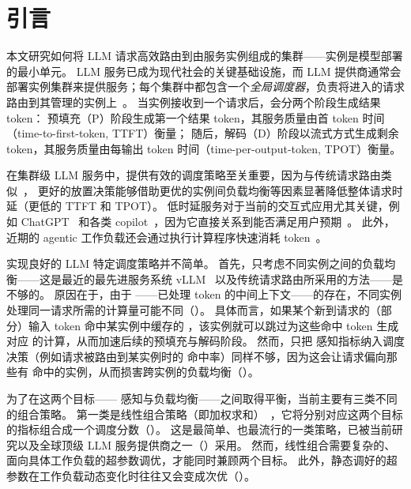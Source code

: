 \section{引言}
\label{sec:intro}

\noindent
本文研究如何将 LLM 请求高效路由到由服务实例组成的集群——实例是模型部署的最小单元。
LLM 服务已成为现代社会的关键基础设施，而 LLM 提供商通常会部署实例集群来提供服务；每个集群中都包含一个\emph{全局调度器}，负责将进入的请求路由到其管理的实例上~\cite{305212,DBLP:conf/sosp/Xiang0QYZYZL0025,
DBLP:journals/corr/abs-2505-09999, llm-d, ai-Dynamo, aigw, vllm-code}。
当实例接收到一个请求后，会分两个阶段生成结果 token：
预填充（P）阶段生成第一个结果 token，其服务质量由首 token 时间（time-to-first-token, TTFT）衡量；
随后，解码（D）阶段以流式方式生成剩余 token，其服务质量由每输出 token 时间（time-per-output-token, TPOT）衡量。

在集群级 LLM 服务中，提供有效的调度策略至关重要，因为与传统请求路由类似~\cite{DBLP:conf/asplos/DelimitrouK14,DBLP:conf/eurosys/ZhangTHJGW13,DBLP:conf/osdi/GogSGWH16}，
更好的放置决策能够借助更优的实例间负载均衡等因素显著降低整体请求时延（更低的 TTFT 和 TPOT）。
低时延服务对于当前的交互式应用尤其关键，例如 ChatGPT~\cite{chatgpt} 和各类 copilot~\cite{copilot}，因为它直接关系到能否满足用户预期~\cite{latency-study,DBLP:conf/osdi/ZhongLCHZL0024,aws-latency}。
此外，近期的 agentic 工作负载还会通过执行计算程序快速消耗 token~\cite{claudeapi,geminiapi,openaiapi}。

实现良好的 LLM 特定调度策略并不简单。
首先，只考虑不同实例之间的负载均衡——这是最近的最先进服务系统 vLLM~\cite{vllm-code} 以及传统请求路由所采用的方法——是不够的。
原因在于，由于 {\kvcache}——已处理 token 的中间上下文——的存在，不同实例处理同一请求所需的计算量可能不同（\textsection{\ref{sec:kvcache-aware}}）。
具体而言，如果某个新到请求的（部分）输入 token 命中某实例中缓存的 {\kvcache}，该实例就可以跳过为这些命中 token 生成对应 {\kvcache} 的计算，从而加速后续的预填充与解码阶段。
然而，只把 {\kvcache} 感知指标纳入调度决策（例如请求被路由到某实例时的 {\kvcache} 命中率）同样不够，因为这会让请求偏向那些有 {\kvcache} 命中的实例，从而损害跨实例的负载均衡（\textsection{\ref{sec:challenge-balancing}}）。

为了在这两个目标——{\kvcache} 感知与负载均衡——之间取得平衡，当前主要有三类不同的组合策略。
第一类是线性组合策略（即加权求和）~\cite{vllm,ai-Dynamo}，它将分别对应这两个目标的指标组合成一个调度分数（\textsection{\ref{sec:linear-combination}}）。
这是最简单、也最流行的一类策略，已被当前研究以及全球顶级 LLM 服务提供商之一（{\company}）采用。
然而，线性组合需要复杂的、面向具体工作负载的超参数调优，才能同时兼顾两个目标。
此外，静态调好的超参数在工作负载动态变化时往往又会变成次优（\textsection{\ref{sec:linear-combination}}）。

